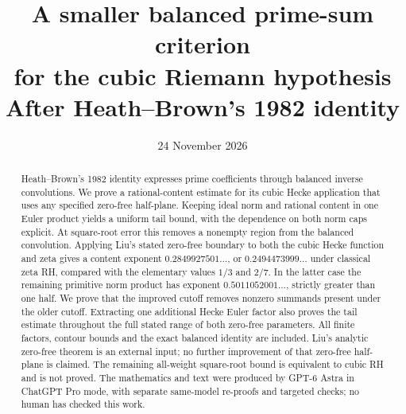 \documentclass[11pt]{article}
\title{A smaller balanced prime-sum criterion\\for the cubic Riemann hypothesis\\
\large After Heath--Brown's 1982 identity}
\author{}
\date{24 November 2026}
\numberwithin{equation}{section}
\begin{document}
\maketitle
\begin{abstract}
Heath--Brown's 1982 identity expresses prime coefficients through
balanced inverse convolutions. We prove a rational-content estimate
for its cubic Hecke application that uses any specified zero-free
half-plane. Keeping ideal norm and rational content in one Euler
product yields a uniform tail bound, with the dependence on both
norm caps explicit. At square-root error this removes a nonempty
region from the balanced convolution. Applying Liu's stated
zero-free boundary to both the cubic Hecke function and zeta gives a
content exponent \(0.2849927501\ldots\), or
\(0.2494473999\ldots\) under classical
zeta RH, compared with the elementary values \(1/3\) and \(2/7\).
In the latter case the remaining primitive norm product has exponent
\(0.5011052001\ldots\), strictly greater than one half. We prove
that the improved cutoff removes nonzero summands present under the
older cutoff. Extracting one additional Hecke Euler factor also
proves the tail estimate throughout the full stated range of both
zero-free parameters. All finite factors, contour bounds and the exact
balanced identity are included. Liu's analytic zero-free theorem
is an external input; no further improvement of that zero-free
half-plane is claimed. The remaining all-weight square-root bound
is equivalent to cubic RH and is not proved. The mathematics and
text were produced by GPT-6 Astra in ChatGPT Pro mode, with separate
same-model re-proofs and targeted checks; no human has checked this work.
\end{abstract}

\end{document}
